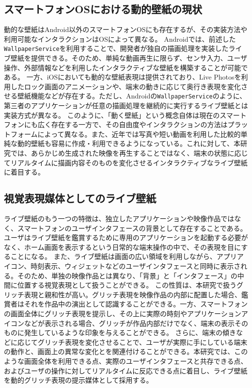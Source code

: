 \subsection{スマートフォンOSにおける動的壁紙の現状}
動的な壁紙はAndroid以外のスマートフォンOSにも存在するが、その実装方法や利用可能なインタラクションはOSによって異なる。
Androidでは、前述した\texttt{WallpaperService}を利用することで、開発者が独自の描画処理を実装したライブ壁紙を提供できる。そのため、単純な動画再生に限らず、センサ入力、ユーザ操作、外部情報などを利用したインタラクティブな壁紙を構築することが可能である。
一方、iOSにおいても動的な壁紙表現は提供されており、Live Photosを利用したロック画面のアニメーションや、端末の動きに応じて奥行き表現を変化させる壁紙機能などが存在する\cite{appleLivePhotoWallpaper,appleSpatialScene}。ただし、Androidの\texttt{WallpaperService}のように、第三者のアプリケーションが任意の描画処理を継続的に実行するライブ壁紙とは実装方式が異なる。
このように、「動く壁紙」という概念自体は現在のスマートフォンにも広く存在する一方で、その自由度やインタラクションの方法はプラットフォームによって異なる。また、近年では写真や短い動画を利用した比較的単純な動的壁紙も容易に作成・利用できるようになっている。これに対して、本研究では、あらかじめ生成された映像を再生することではなく、端末の状態に応じてリアルタイムに描画内容そのものを変化させるインタラクティブなライブ壁紙に着目する。


\subsection{視覚表現媒体としてのライブ壁紙}
ライブ壁紙のもう一つの特徴は、独立したアプリケーションや映像作品ではなく、スマートフォンのユーザインタフェースの背景として存在することである。ユーザはライブ壁紙を鑑賞するために専用のアプリケーションを起動する必要がなく、ホーム画面を表示するという日常的な端末操作の中で、その表現を目にすることになる。
また、ライブ壁紙は画面の広い領域を利用しながら、アプリアイコン、時刻表示、ウィジェットなどのユーザインタフェースと同時に表示される。そのため、単独の映像作品とは異なり、「背景」と「インタフェース」の中間に位置する視覚表現として扱うことができる。
この性質は、本研究で扱うグリッチ表現と親和性が高い。グリッチ表現を映像作品の内部に配置した場合、鑑賞者はそれを作品中の演出として認識することができる。一方、スマートフォンの画面全体にグリッチ表現を提示し、その上に実際の時刻やアプリケーションアイコンなどが表示される場合、グリッチが作品内部だけでなく、端末の表示そのものに発生しているような印象を与えることができる。
さらに、端末の傾きなどに応じてグリッチ表現を変化させることで、ユーザが実際に手にしている端末の動作と、画面上の異常な変化とを関連付けることができる。本研究では、このような画面全体を利用できる点、実際のユーザインタフェースと共存できる点、およびユーザの操作に対してリアルタイムに反応できる点に着目し、ライブ壁紙を動的グリッチ表現の提示媒体として採用する。

